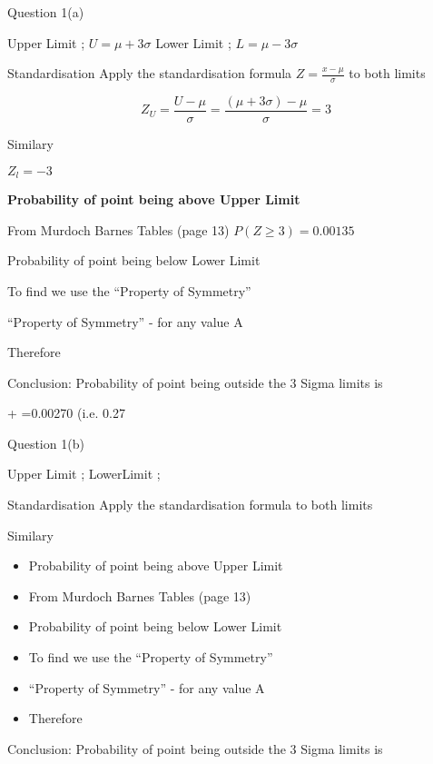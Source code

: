 

Question 1(a)

Upper Limit ;  $U = \mu + 3 \sigma $
Lower Limit ;  $L = \mu - 3 \sigma $

Standardisation
Apply the standardisation formula	$Z=\frac{x-\mu}{\sigma} $	to both limits

\[ Z_U = \frac{U-\mu}{\sigma} =  \frac{(\mu + 3 \sigma)-\mu}{\sigma} = 3\]

Similary

$Z_l=-3$ 

\noindent \textbf{Probability of point being above Upper Limit}

From Murdoch Barnes Tables (page 13)  $P(Z \geq 3)=0.00135$

Probability of point being below Lower Limit


To find   we use the “Property of Symmetry”

“Property of Symmetry” -   for any value A

Therefore 

Conclusion: 
Probability of point being outside the 3 Sigma limits is

+ =0.00270 	(i.e. 0.27%



Question 1(b)

Upper Limit ;  
LowerLimit ;  

Standardisation
Apply the standardisation formula	 	to both limits


Similary

\begin{itemize}
	\item 		Probability of point being above Upper Limit
	
	\item 	From Murdoch Barnes Tables (page 13)  
	
	\item 	Probability of point being below Lower Limit
	
	
	\item 	To find   we use the “Property of Symmetry”
	
	\item 	“Property of Symmetry” -   for any value A
	
	\item 	Therefore 
\end{itemize}	



Conclusion: 
Probability of point being outside the 3 Sigma limits is

